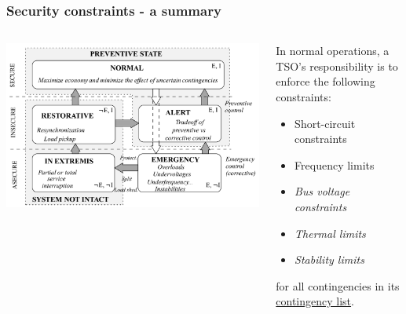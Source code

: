 \documentclass[compress]{beamer}
\begin{document}
\begin{frame}
\frametitle{Security constraints - a summary}
\begin{columns}
\begin{column}{0.5\textwidth}
\includegraphics[width=\textwidth]{Figs/FinkCarlsen_SecurityDiagram_trimmed.png}
\end{column}
\begin{column}{0.5\textwidth}
In normal operations, a TSO's responsibility is to enforce the following constraints:
\begin{itemize}
\item Short-circuit constraints
\item Frequency limits
\item \emph{Bus voltage constraints}
\item \emph{Thermal limits}
\item \emph{Stability limits}
\end{itemize}
for all contingencies in its \underline{contingency list}.
\end{column}
\end{columns}
\end{frame}
\end{document}
